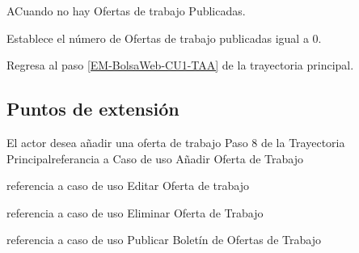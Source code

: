 \begin{UCtrayectoriaA}{A}{Cuando no hay Ofertas de trabajo Publicadas.}
	
	\UCpaso Establece el número de Ofertas de trabajo publicadas igual a 0. 

	\UCpaso Regresa al paso \ref{EM-BolsaWeb-CU1-TAA} de la trayectoria principal.
\end{UCtrayectoriaA}

\subsection{Puntos de extensión}

 {El actor desea añadir una oferta de trabajo} {Paso 8 de la Trayectoria Principal}{referancia a Caso de uso Añadir Oferta de Trabajo}


 {referencia a caso de uso Editar Oferta de trabajo}

 {referencia a caso de uso Eliminar Oferta de Trabajo}

 {referencia a caso de uso Publicar Boletín de Ofertas de Trabajo}
